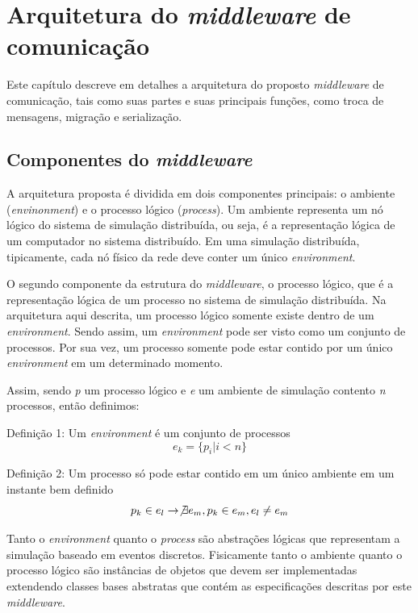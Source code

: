 \chapter{Arquitetura do \textit{middleware} de comunicação \label{chapter_middleware}}

Este capítulo descreve em detalhes a arquitetura do proposto \textit{middleware} de comunicação, tais como suas partes e suas principais funções, como troca de mensagens, migração e serialização. 

\section{Componentes do \textit{middleware}}

A arquitetura proposta é dividida em dois componentes principais: o ambiente (\textit{envinonment}) e o processo lógico (\textit{process}). Um ambiente representa um nó lógico do sistema de simulação distribuída, ou seja, é a representação lógica de um computador no sistema distribuído. Em uma simulação distribuída, tipicamente, cada nó físico da rede deve conter um único \textit{environment}.

O segundo componente da estrutura do \textit{middleware}, o processo lógico, que é a representação lógica de um processo no sistema de simulação distribuída. Na arquitetura aqui descrita, um processo lógico somente existe dentro de um \textit{environment}. Sendo assim, um \textit{environment} pode ser visto como um conjunto de processos. Por sua vez, um processo somente pode estar contido por um único \textit{environment} em um determinado momento.

Assim, sendo \textit{p} um processo lógico e \textit{e} um ambiente de simulação contento \textit{n} processos, então definimos:

Definição 1: Um \textit{environment} é um conjunto de processos \begin{equation} e_{k} = \{p_{i} | i < n \} \end{equation}

Definição 2: Um processo só pode estar contido em um único ambiente em um instante bem definido \begin{equation} p_{k} \in e_{l} \rightarrow \not \exists e_{m}, p_{k} \in e_{m}, e_{l} \neq e_{m} \end{equation} 

Tanto o \textit{environment} quanto o \textit{process} são abstrações lógicas que representam a simulação baseado em eventos discretos. Fisicamente tanto o ambiente quanto o processo lógico são instâncias de objetos que devem ser implementadas extendendo classes bases abstratas que contém as especificações descritas por este \textit{middleware}.

